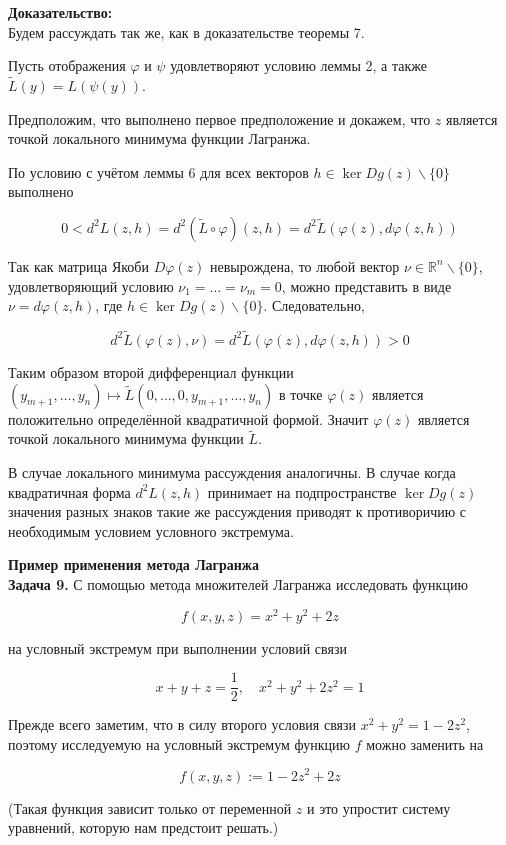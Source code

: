 \documentclass[a4paper,12pt]{article} %
\begin{document}
\textbf{Доказательство:}\\
Будем рассуждать так же, как в доказательстве теоремы 7.

Пусть отображения $\varphi$ и $\psi$ удовлетворяют условию леммы 2, а также $\tilde{L}(y)=L(\psi(y))$.

Предположим, что выполнено первое предположение и докажем, что $z$ является точкой локального минимума функции Лагранжа.

По условию с учётом леммы 6 для всех векторов $h \in \operatorname{ker} D g(z) \backslash\{0\}$ выполнено

$$
0<d^{2} L(z, h)=d^{2}(\tilde{L} \circ \varphi)(z, h)=d^{2} \tilde{L}(\varphi(z), d \varphi(z, h))
$$

Так как матрица Якоби $D \varphi(z)$ невырождена, то любой вектор $\nu \in \mathbb{R}^{n} \backslash\{0\}$, удовлетворяющий условию $\nu_{1}=\ldots=\nu_{m}=0$, можно представить в виде $\nu=d \varphi(z, h)$, где $h \in \operatorname{ker} D g(z) \backslash\{0\}$. Следовательно,

$$
d^{2} \tilde{L}(\varphi(z), \nu)=d^{2} \tilde{L}(\varphi(z), d \varphi(z, h))>0
$$

Таким образом второй дифференциал функции $\left(y_{m+1}, \ldots, y_{n}\right) \mapsto \tilde{L}\left(0, \ldots, 0, y_{m+1}, \ldots, y_{n}\right)$ в точке $\varphi(z)$ является положительно определённой квадратичной формой. Значит $\varphi(z)$ является точкой локального минимума функции $\tilde{L}$.

В случае локального минимума рассуждения аналогичны. В случае когда квадратичная форма $d^{2} L(z, h)$ принимает на подпространстве $\operatorname{ker} D g(z)$ значения разных знаков такие же рассуждения приводят к противоричию с необходимым условием условного экстремума.

\textbf{Пример применения метода Лагранжа}\\
\textbf{Задача 9.} С помощью метода множителей Лагранжа исследовать функцию

$$
f(x, y, z)=x^{2}+y^{2}+2 z
$$

на условный экстремум при выполнении условий связи

$$
x+y+z=\frac{1}{2}, \quad x^{2}+y^{2}+2 z^{2}=1
$$

Прежде всего заметим, что в силу второго условия связи $x^{2}+y^{2}=1-2 z^{2}$, поэтому исследуемую на условный экстремум функцию $f$ можно заменить на

$$
f(x, y, z):=1-2 z^{2}+2 z
$$

(Такая функция зависит только от переменной $z$ и это упростит систему уравнений, которую нам предстоит решать.)
\end{document}
